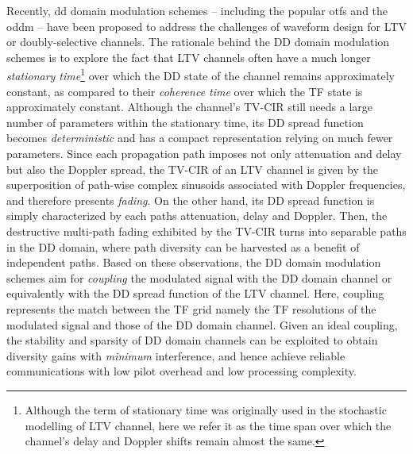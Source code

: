 \documentclass[journal]{IEEEtran}
\begin{document}
Recently, \ac{dd} domain modulation schemes -- including the popular \ac{otfs} \cite{otfs_wcnc_2017,hadani_otfs_2018} and the \ac{oddm}\cite{oddmicc22,oddm} -- have been proposed to address the challenges of waveform design for LTV or doubly-selective channels.
The rationale behind the DD domain modulation schemes is to explore the fact that LTV channels often have a much longer \emph{stationary time}\footnote{Although the term of stationary time was originally used in the stochastic modelling of LTV channel, here we refer it as the time span over which the channel's delay and Doppler shifts remain almost the same.} over which the DD state of the channel remains approximately constant, as compared to their \emph{coherence time} over which the TF state is approximately constant\cite{Hlawatsch2011}.  Although the channel's TV-CIR still needs a large number of parameters within the stationary time, its DD spread function becomes \emph{deterministic} and has a compact representation relying on much fewer parameters.
Since each propagation path imposes not only attenuation and delay but also the Doppler spread, the TV-CIR of an LTV channel is given by the superposition of path-wise complex sinusoids associated with Doppler frequencies, and therefore presents \emph{fading}.
On the other hand, its DD spread function is simply characterized by each paths attenuation, delay and Doppler. Then, the destructive multi-path fading exhibited by the TV-CIR turns into separable paths in the DD domain, where path diversity can be harvested as a benefit of independent paths\cite{yuan_wcm_2021}.
Based on these observations, the DD domain modulation schemes aim for \emph{coupling} \cite{hadani_otfs_2018} the modulated signal with the DD domain channel or equivalently with the DD spread function of the LTV channel.
Here, coupling represents the match between the TF grid namely the TF resolutions of the modulated signal and those of the DD domain channel\cite{oddm}.
Given an ideal coupling, the stability and sparsity of DD domain channels can be exploited to obtain diversity gains with \emph{minimum} interference, and hence achieve reliable communications with low pilot overhead and low processing complexity\cite{hadani_otfs_2018}.
\end{document}
